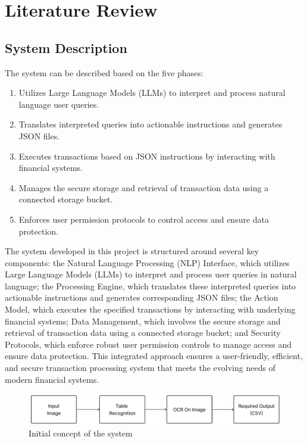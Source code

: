 \chapter{Literature Review}
 
\setcounter{equation}{0}

\section{System Description}

The system can be described based on the five phases: 
   \begin{enumerate}
        \item  Utilizes Large Language Models (LLMs) to interpret and process natural language user queries. 
        \item Translates interpreted queries into actionable instructions and generates JSON files. 
        \item Executes transactions based on JSON instructions by interacting with financial systems.
	\item Manages the secure storage and retrieval of transaction data using a connected storage bucket.
        \item Enforces user permission protocols to control access and ensure data protection.
    \end{enumerate}

\noindent The system developed in this project is structured around several key components: the Natural Language Processing (NLP) Interface, which utilizes Large Language Models (LLMs) to interpret and process user queries in natural language; the Processing Engine, which translates these interpreted queries into actionable instructions and generates corresponding JSON files; the Action Model, which executes the specified transactions by interacting with underlying financial systems; Data Management, which involves the secure storage and retrieval of transaction data using a connected storage bucket; and Security Protocols, which enforce robust user permission controls to manage access and ensure data protection. This integrated approach ensures a user-friendly, efficient, and secure transaction processing system that meets the evolving needs of modern financial systems. 

\begin{figure}[h!]
    \centering
    \includegraphics[width=1\textwidth]{Images/lit_review/Initial concept of our system.jpg}
    \caption{Initial concept of the system}
\end{figure}

